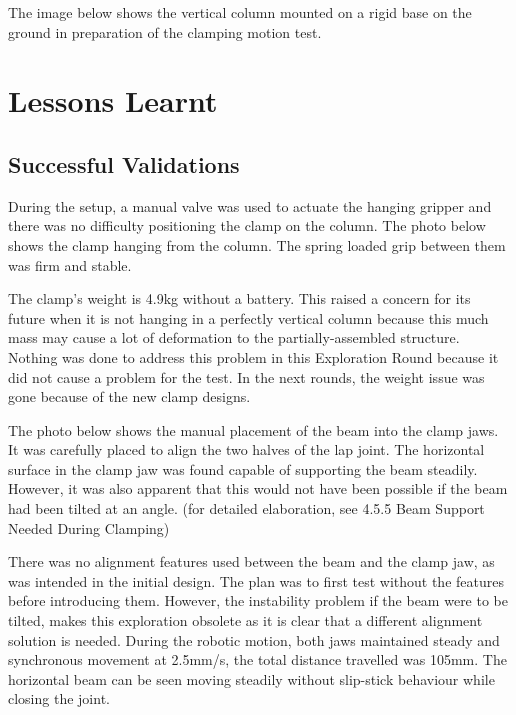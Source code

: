     The image below shows the vertical column mounted on a rigid base on the ground in preparation of the clamping motion test.

\section{Lessons Learnt}
\subsection{Successful Validations}
During the setup, a manual valve was used to actuate the hanging gripper and there was no difficulty positioning the clamp on the column. The photo below shows the clamp hanging from the column. The spring loaded grip between them was firm and stable. 

The clamp’s weight is 4.9kg without a battery. This raised a concern for its future when it is not hanging in a perfectly vertical column because this much mass may cause a lot of deformation to the partially-assembled structure. Nothing was done to address this problem in this Exploration Round because it did not cause a problem for the test. In the next rounds, the weight issue was gone because of the new clamp designs. 

The photo below shows the manual placement of the beam into the clamp jaws. It was carefully placed to align the two halves of the lap joint. The horizontal surface in the clamp jaw was found capable of supporting the beam steadily. However, it was also apparent that this would not have been possible if the beam had been tilted at an angle. (for detailed elaboration, see 4.5.5 Beam Support Needed During Clamping)

There was no alignment features used between the beam and the clamp jaw, as was intended in the initial design. The plan was to first test without the features before introducing them. However, the instability problem if the beam were to be tilted, makes this exploration obsolete as it is clear that a different alignment solution is needed.
During the robotic motion, both jaws maintained steady and synchronous movement at 2.5mm/s, the total distance travelled was 105mm. The horizontal beam can be seen moving steadily without slip-stick behaviour while closing the joint.  

